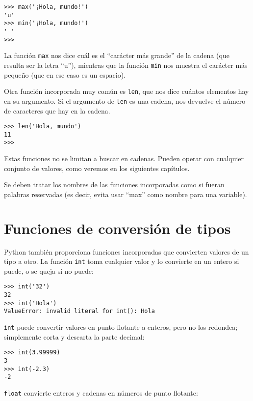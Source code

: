 \beforeverb
\begin{verbatim}
>>> max('¡Hola, mundo!')
'u'
>>> min('¡Hola, mundo!')
' '
>>>
\end{verbatim}
\afterverb
%
La función {\tt max} nos dice cuál es el ``carácter más grande'' de la
cadena (que resulta ser la letra ``u''), mientras que la función
{\tt min} nos muestra el carácter más pequeño (que en ese caso es
un espacio).

Otra función incorporada muy común es {\tt len},
que nos dice cuántos elementos hay en su argumento. Si el argumento
de {\tt len} es una cadena, nos devuelve el número de caracteres
que hay en la cadena.

\beforeverb
\begin{verbatim}
>>> len('Hola, mundo')
11
>>>
\end{verbatim}
\afterverb
%
Estas funciones no se limitan a buscar en cadenas. Pueden operar con
cualquier conjunto de valores, como veremos en los siguientes capítulos.

Se deben tratar los nombres de las funciones incorporadas como si fueran palabras reservadas
(es decir, evita usar ``max'' como nombre para una variable).

\section{Funciones de conversión de tipos}



Python también proporciona funciones incorporadas que convierten valores
de un tipo a otro. La función {\tt int} toma cualquier valor y
lo convierte en un entero si puede, o se queja si no puede:


\beforeverb
\begin{verbatim}
>>> int('32')
32
>>> int('Hola')
ValueError: invalid literal for int(): Hola
\end{verbatim}
\afterverb
%
{\tt int} puede convertir valores en punto flotante a enteros, pero no
los redondea; simplemente corta y descarta la parte decimal:

\beforeverb
\begin{verbatim}
>>> int(3.99999)
3
>>> int(-2.3)
-2
\end{verbatim}
\afterverb
%
{\tt float} convierte enteros y cadenas en números
de punto flotante:

